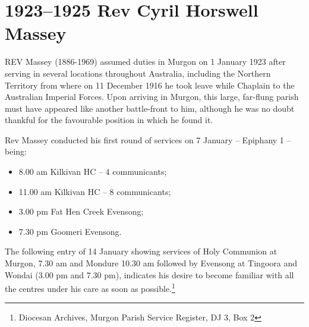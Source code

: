 \begin{quote}

\end{quote}



\balance


\printendnotes[custom]
\setcounter{endnote}{0}
\chapter{1923--1925 Rev Cyril Horswell Massey}
\nobalance


\lettrine[lines=3]{R}{EV}
 Massey (1886-1969) assumed duties in Murgon on 1 January 1923 after serving in several locations throughout Australia, including the Northern Territory from where on 11 December 1916 he took leave while Chaplain to the Australian Imperial Forces. Upon arriving in Murgon, this large, far-flung parish must have appeared like another battle-front to him, although he was no doubt thankful for the favourable position in which he found it.

Rev Massey conducted his first round of services on 7 January -- Epiphany 1 -- being:



\begin{itemize}

\item

  8.00 am Kilkivan HC -- 4 communicants;

\item

  11.00 am Kilkivan HC -- 8 communicants;

\item

  3.00 pm Fat Hen Creek Evensong;

\item

  7.30 pm Goomeri Evensong.

\end{itemize}



\smallskip


The following entry of 14 January showing services of Holy Communion at Murgon, 7.30 am and Mondure 10.30 am followed by Evensong at Tingoora and Wondai (3.00 pm and 7.30 pm), indicates his desire to become familiar with all the centres under his care as soon as possible.\footnote{Diocesan Archives, Murgon Parish Service Register, DJ 3, Box 2}


